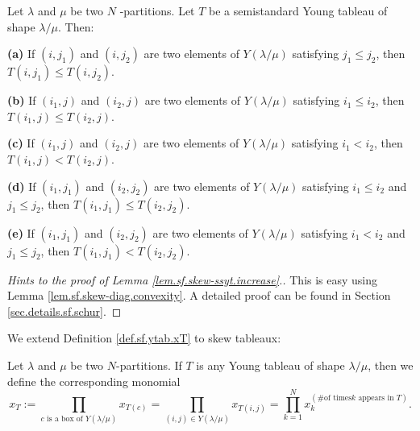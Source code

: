 \begin{lemma}
\label{lem.sf.skew-ssyt.increase}Let $\lambda$ and $\mu$ be two $N$%
-partitions. Let $T$ be a semistandard Young tableau of shape $\lambda/\mu$.
Then: \medskip

\textbf{(a)} If $\left(  i,j_{1}\right)  $ and $\left(  i,j_{2}\right)  $ are
two elements of $Y\left(  \lambda/\mu\right)  $ satisfying $j_{1}\leq j_{2}$,
then $T\left(  i,j_{1}\right)  \leq T\left(  i,j_{2}\right)  $. \medskip

\textbf{(b)} If $\left(  i_{1},j\right)  $ and $\left(  i_{2},j\right)  $ are
two elements of $Y\left(  \lambda/\mu\right)  $ satisfying $i_{1}\leq i_{2}$,
then $T\left(  i_{1},j\right)  \leq T\left(  i_{2},j\right)  $. \medskip

\textbf{(c)} If $\left(  i_{1},j\right)  $ and $\left(  i_{2},j\right)  $ are
two elements of $Y\left(  \lambda/\mu\right)  $ satisfying $i_{1}<i_{2}$, then
$T\left(  i_{1},j\right)  <T\left(  i_{2},j\right)  $. \medskip

\textbf{(d)} If $\left(  i_{1},j_{1}\right)  $ and $\left(  i_{2}%
,j_{2}\right)  $ are two elements of $Y\left(  \lambda/\mu\right)  $
satisfying $i_{1}\leq i_{2}$ and $j_{1}\leq j_{2}$, then $T\left(  i_{1}%
,j_{1}\right)  \leq T\left(  i_{2},j_{2}\right)  $. \medskip

\textbf{(e)} If $\left(  i_{1},j_{1}\right)  $ and $\left(  i_{2}%
,j_{2}\right)  $ are two elements of $Y\left(  \lambda/\mu\right)  $
satisfying $i_{1}<i_{2}$ and $j_{1}\leq j_{2}$, then $T\left(  i_{1}%
,j_{1}\right)  <T\left(  i_{2},j_{2}\right)  $.
\end{lemma}

\begin{proof}
[Hints to the proof of Lemma \ref{lem.sf.skew-ssyt.increase}.]This is easy
using Lemma \ref{lem.sf.skew-diag.convexity}. A detailed proof can be found in
Section \ref{sec.details.sf.schur}.
\end{proof}

We extend Definition \ref{def.sf.ytab.xT} to skew tableaux:

\begin{definition}
\label{def.sf.ytab.skew-xT}Let $\lambda$ and $\mu$ be two $N$-partitions. If
$T$ is any Young tableau of shape $\lambda/\mu$, then we define the
corresponding monomial%
\[
x_{T}:=\prod_{c\text{ is a box of }Y\left(  \lambda/\mu\right)  }x_{T\left(
c\right)  }=\prod_{\left(  i,j\right)  \in Y\left(  \lambda/\mu\right)
}x_{T\left(  i,j\right)  }=\prod_{k=1}^{N}x_{k}^{\left(  \text{\# of times
}k\text{ appears in }T\right)  }.
\]

\end{definition}

